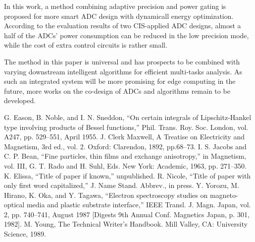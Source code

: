 \documentclass[conference]{IEEEtran}
\begin{document}
In this work, a method combining adaptive precision and power gating is proposed for more smart ADC design with dynamicall energy optimization. According to the evaluation results of two CIS-applied ADC designs, almost a half of the ADCs’ power consumption can be reduced in the low precision mode, while the cost of extra control circuits is rather small.

 The method in this paper is universal and has prospects to be combined with varying downstream intelligent algorithms for efficient multi-tasks analysis. As such an integrated system will be more promising for edge computing in the future, more works on the co-design of ADCs and algorithms remain to be developed.

\begin{thebibliography}{00}
 G. Eason, B. Noble, and I. N. Sneddon, ``On certain integrals of Lipschitz-Hankel type involving products of Bessel functions,'' Phil. Trans. Roy. Soc. London, vol. A247, pp. 529--551, April 1955.
 J. Clerk Maxwell, A Treatise on Electricity and Magnetism, 3rd ed., vol. 2. Oxford: Clarendon, 1892, pp.68--73.
 I. S. Jacobs and C. P. Bean, ``Fine particles, thin films and exchange anisotropy,'' in Magnetism, vol. III, G. T. Rado and H. Suhl, Eds. New York: Academic, 1963, pp. 271--350.
 K. Elissa, ``Title of paper if known,'' unpublished.
 R. Nicole, ``Title of paper with only first word capitalized,'' J. Name Stand. Abbrev., in press.
 Y. Yorozu, M. Hirano, K. Oka, and Y. Tagawa, ``Electron spectroscopy studies on magneto-optical media and plastic substrate interface,'' IEEE Transl. J. Magn. Japan, vol. 2, pp. 740--741, August 1987 [Digests 9th Annual Conf. Magnetics Japan, p. 301, 1982].
 M. Young, The Technical Writer's Handbook. Mill Valley, CA: University Science, 1989.
\end{thebibliography}
\end{document}
